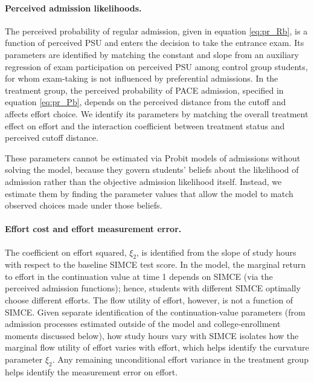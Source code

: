 \paragraph{Perceived admission likelihoods.} 
The perceived probability of regular admission, given in equation \eqref{eq:pr_Rb}, is a function of perceived PSU and enters the decision to take the entrance exam. Its parameters are identified by matching the constant and slope from an auxiliary regression of exam participation on perceived PSU among control group students, for whom exam-taking is not influenced by preferential admissions. In the treatment group, the perceived probability of PACE admission, specified in equation \eqref{eq:pr_Pb}, depends on the perceived distance from the cutoff and affects effort choice. We identify its parameters by matching the overall treatment effect on effort and the interaction coefficient between treatment status and perceived cutoff distance.\par 
These parameters cannot be estimated via Probit models of admissions without solving the model, because they govern students' beliefs about the likelihood of admission rather than the objective admission likelihood itself. Instead, we estimate them by finding the parameter values that allow the model to match observed choices made under those beliefs.  \par

\paragraph{Effort cost and effort measurement error.} The coefficient on effort squared, $\xi_{2}$, is identified from the slope of study hours with respect to the baseline SIMCE test score. In the model, the marginal return to effort in the continuation value at time 1 depends on SIMCE (via the perceived admission functions); hence, students with different SIMCE optimally choose different efforts. The flow utility of effort, however, is not a function of SIMCE. Given separate identification of the continuation-value parameters (from admission processes estimated outside of the model and college-enrollment moments discussed below), how study hours vary with SIMCE isolates how the marginal flow utility of effort varies with effort, which helps identify the curvature parameter $\xi_2$. Any remaining unconditional effort variance in the treatment group helps identify the measurement error on effort.\par 



